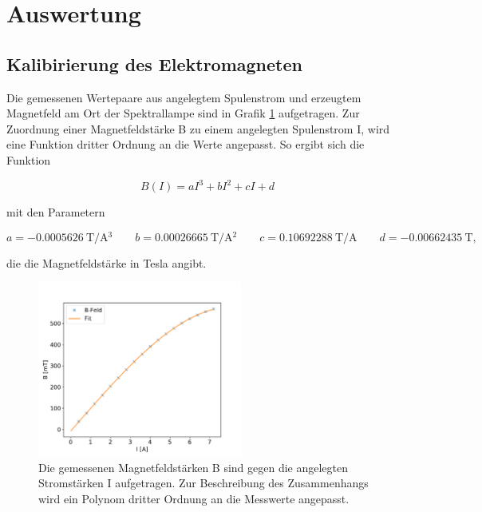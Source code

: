 \newpage
\section{Auswertung}

    \subsection{Kalibirierung des Elektromagneten}
        Die gemessenen Wertepaare aus angelegtem Spulenstrom und erzeugtem Magnetfeld am Ort der Spektrallampe sind in Grafik \ref{fig:Magnetfeld} aufgetragen. Zur Zuordnung einer Magnetfeldstärke B zu einem 
        angelegten Spulenstrom I, wird eine Funktion dritter Ordnung an die Werte angepasst. So ergibt sich die Funktion

        \begin{equation}
            B(I) = aI^3 + bI^2 + cI + d
            \label{eqn:kalibration}
        \end{equation}
        
        mit den Parametern 

        \begin{equation*}
          a =\SI{-0.0005626}{\tesla \per \ampere^3} \qquad b =\SI{0.00026665}{\tesla \per \ampere^2} \qquad c =\SI{0.10692288}{\tesla \per \ampere}   \qquad   d =\SI{-0.00662435}{\tesla },
        \end{equation*}
            
        die die Magnetfeldstärke in Tesla angibt.
        \FloatBarrier

        \begin{figure}[h]
          \centering
          \includegraphics[width = 0.6\textwidth]{magnetfeld.pdf}
          \caption{Die gemessenen Magnetfeldstärken B sind gegen die angelegten Stromstärken I aufgetragen. Zur Beschreibung des Zusammenhangs wird ein Polynom dritter Ordnung an die Messwerte angepasst.}
          \label{fig:Magnetfeld}
        \end{figure}
    
